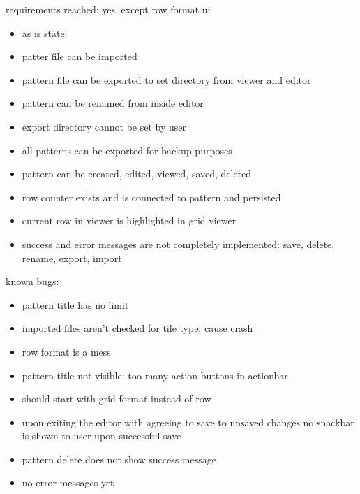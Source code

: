 


requirements reached:
yes, except row format ui

\begin{itemize}
\item as is state:
\item patter file can be imported
\item pattern file can be exported to set directory from viewer and editor
\item pattern can be renamed from inside editor
\item export directory cannot be set by user
\item all patterns can be exported for backup purposes
\item pattern can be created, edited, viewed, saved, deleted
\item row counter exists and is connected to pattern and persisted
\item current row in viewer is highlighted in grid viewer
\item success and error messages are not completely implemented: save, delete, rename, export, import
\end{itemize}

known bugs:
\begin{itemize}
\item pattern title has no limit
\item imported files aren't checked for tile type, cause crash
\item row format is a mess
\item pattern title not visible: too many action buttons in actionbar
\item should start with grid format instead of row
\item upon exiting the editor with agreeing to save to unsaved changes no snackbar is shown to user upon successful save
\item pattern delete does not show success message
\item no error messages yet
\end{itemize}

